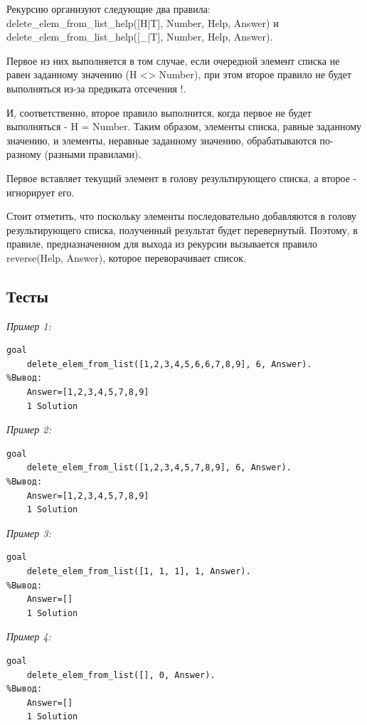 \documentclass[a4paper,12pt]{article}
\begin{document}
Рекурсию организуют следующие два правила: delete\_elem\_from\_list\_help([H|T], Number, Help, Answer) и delete\_elem\_from\_list\_help([\_|T], Number, Help, Answer). 

Первое из них выполняется в том случае, если очередной элемент списка не равен заданному значению (H <> Number), при этом второе правило не будет выполняться из-за предиката отсечения !.

И, соответственно, второе правило выполнится, когда первое не будет выполняться - H = Number. Таким образом, элементы списка, равные заданному значению, и элементы, неравные заданному значению, обрабатываются по-разному (разными правилами).

Первое вставляет текущий элемент в голову результирующего списка, а второе - игнорирует его.

Стоит отметить, что поскольку элементы последовательно добавляются в голову результирующего списка, полученный результат будет перевернутый. Поэтому, в правиле, предназначенном для выхода из рекурсии вызывается правило reverse(Help, Answer), которое переворачивает список.

\subsection*{Тесты}

\textit{Пример 1:}

\begin{verbatim}
goal
	delete_elem_from_list([1,2,3,4,5,6,6,7,8,9], 6, Answer).
%Вывод:
	Answer=[1,2,3,4,5,7,8,9]
	1 Solution
\end{verbatim}

\textit{Пример 2:}

\begin{verbatim}
goal
	delete_elem_from_list([1,2,3,4,5,7,8,9], 6, Answer).
%Вывод:
	Answer=[1,2,3,4,5,7,8,9]
	1 Solution
\end{verbatim}

\textit{Пример 3:}

\begin{verbatim}
goal
	delete_elem_from_list([1, 1, 1], 1, Answer).
%Вывод:
	Answer=[]
	1 Solution
\end{verbatim}

\textit{Пример 4:}

\begin{verbatim}
goal
	delete_elem_from_list([], 0, Answer).
%Вывод:
	Answer=[]
	1 Solution
\end{verbatim}
\end{document}
